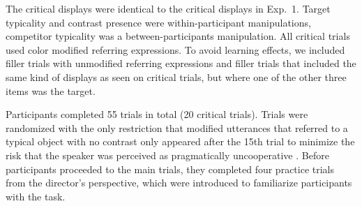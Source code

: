 \documentclass[10pt,letterpaper]{article}
\begin{document}
The critical displays were identical to the critical displays in Exp.~1.
Target typicality and contrast presence were within-participant manipulations, competitor typicality was a between-participants manipulation. All critical trials used color modified referring expressions. 
To avoid learning effects, we included filler trials with unmodified referring expressions and filler trials that included the same kind of displays as seen on critical trials, but where one of the other three items was the target. 

Participants completed 55 trials in total (20 critical trials). Trials were randomized with the only restriction that modified utterances that referred to a typical object with no contrast only appeared after the 15th trial to minimize the risk that the speaker was perceived as pragmatically uncooperative \cite{Grodner:2011}. Before participants proceeded to the main trials, they completed four practice trials from the director's perspective, which were introduced to familiarize participants with the task.
  
  




\end{document}
